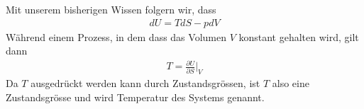 \begin{bemerkung}
    Mit unserem bisherigen Wissen folgern wir, dass
    \begin{align*}
        dU = T dS - p dV
    \end{align*}
    Während einem Prozess, in dem dass das Volumen $V$ konstant gehalten wird,
    gilt dann
    \begin{align*}
        T = \frac{\partial U}{\partial S} \Big|_V
    \end{align*}
    Da $T$ ausgedrückt werden kann durch Zustandsgrössen, ist $T$ also eine
    Zustandsgrösse und wird Temperatur des Systems genannt.
\end{bemerkung}
